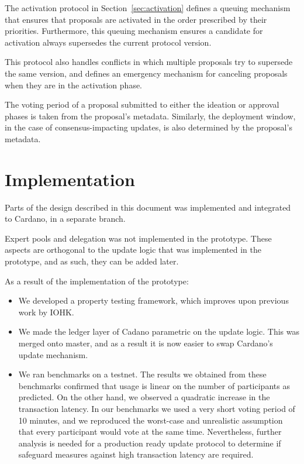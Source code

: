 \documentclass[11pt,a4paper]{article}
\begin{document}
The activation protocol in Section~\ref{sec:activation} defines a queuing
mechanism that ensures that proposals are activated in the order prescribed by
their priorities. Furthermore, this queuing mechanism ensures a candidate
for activation always supersedes the current protocol version.

This protocol also handles conflicts in which multiple proposals try to
supersede the same version, and defines an emergency mechanism for canceling
proposals when they are in the activation phase.

The voting period of a proposal submitted to either the ideation or approval
phases is taken from the proposal's metadata.
Similarly, the deployment window, in the case of consensus-impacting updates, is
also determined by the proposal's metadata.

\section{Implementation}
\label{sec:implementation-1}

Parts of the design described in this document was implemented and integrated to Cardano,
in a separate branch.

Expert pools and delegation was not implemented in the prototype. These aspects
are orthogonal to the update logic that was implemented in the prototype, and as
such, they can be added later.

As a result of the implementation of the prototype:
\begin{itemize}
\item We developed a property testing framework, which improves upon previous
  work by IOHK.
\item We made the ledger layer of Cadano parametric on the update logic. This
  was merged onto master, and as a result it is now easier to swap Cardano's
  update mechanism.
\item We ran benchmarks on a testnet. The results we obtained from these
  benchmarks confirmed that usage is linear on the number of participants as
  predicted. On the other hand, we observed a quadratic increase in the
  transaction latency. In our benchmarks we used a very short voting period of
  10 minutes, and we reproduced the worst-case and unrealistic assumption that
  every participant would vote at the same time. Nevertheless, further analysis
  is needed for a production ready update protocol to determine if safeguard
  measures against high transaction latency are required.
\end{itemize}
\end{document}
